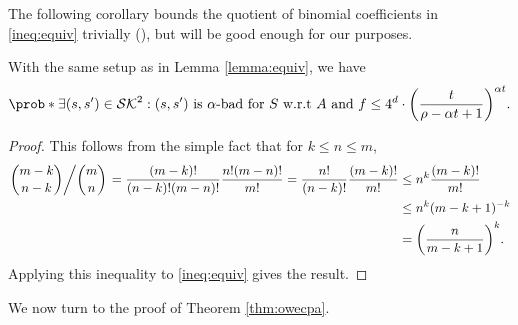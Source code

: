 \begin{remark}
\end{remark}

The following corollary bounds the quotient of binomial coefficients in \eqref{ineq:equiv}
trivially (), but will be good enough for our purposes.

\begin{corollary}\label{corollary:equiv}
  With the same setup as in Lemma \ref{lemma:equiv}, we have
  \begin{equation}\label{ineq:corollary:equiv}
    \prob*{\exists (s,s') \in \setSK^{2} : (s,s') \text{ is \(\alpha\)-bad for } S \text{ w.r.t \(A\) and \(f\)}}
    \le 4^{d} \cdot \left( \frac{t}{\rho - \alpha t + 1} \right)^{\alpha t}.
  \end{equation}
\end{corollary}

\begin{proof}
  This follows from the simple fact that for \(k \le n \le m\),
  \begin{align}
    \left. \binom{m - k}{n - k} \middle/ \binom{m}{n} \right.
    = \frac{(m-k)!}{(n-k)!(m-n)!} \frac{n!(m-n)!}{m!}
    = \frac{n!}{(n-k)!} \frac{(m-k)!}{m!} \notag
    & \le n^{k} \frac{(m-k)!}{m!} \notag\\
    & \le n^{k} (m-k+1)^{-k} \notag\\
    & = \left( \frac{n}{m - k + 1} \right)^{k}. \notag
  \end{align}
  Applying this inequality to \eqref{ineq:equiv} gives the result.
\end{proof}

We now turn to the proof of Theorem \ref{thm:owecpa}.


